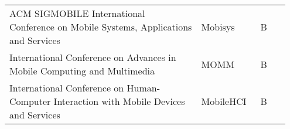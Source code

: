 \documentclass{article}
\begin{document}
\begin{table}[t]
\begin{tabular}{C{0.65\linewidth}C{0.2\linewidth}C{0.1\linewidth}}
ACM SIGMOBILE International Conference on Mobile Systems, Applications and Services                    & Mobisys                              & B                                 \\
\cmidrule(l){1-3}



International Conference on Advances in Mobile Computing and Multimedia                                & MOMM                                 & B                                 \\
\cmidrule(l){1-3}

International Conference on Human-Computer Interaction with Mobile Devices and Services                & MobileHCI                            & B                                 \\
\cmidrule(l){1-3}







\end{tabular}
\end{table}
\end{document}
